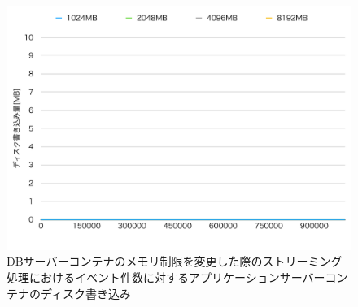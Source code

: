 \documentclass[../../../../../main]{subfiles}
\begin{document}
    \begin{figure}[H]
        \centering
        \includegraphics[width=12cm]{graph}
        \caption{DBサーバーコンテナのメモリ制限を変更した際のストリーミング処理におけるイベント件数に対するアプリケーションサーバーコンテナのディスク書き込み}
        \label{fig:stream-change-db-memory-limit-app-disk-in-app_4_8192-db_400}
    \end{figure}
\end{document}
